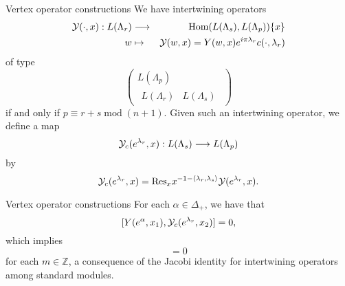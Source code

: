 \documentclass{beamer}
\begin{document}

\begin{frame}{Vertex operator constructions}
 We have intertwining operators
\begin{eqnarray*} \label{IntwOp}{ \cal Y}( \cdot , x): L(\Lambda_r) &
 \longrightarrow & \mbox{Hom}(L(\Lambda_s), L( \Lambda_p))\{ x \} \\ w
 & \mapsto & {\cal Y}(w, x)=Y(w, x)e^{i\pi\lambda_r}c(\cdot,
 \lambda_r) \nonumber \end{eqnarray*}
of type 
\begin{equation*} 
\label{type} \left( \begin{array} {c} L(
 \Lambda_p) \\ \begin{array}{cc} L( \Lambda_r) & L( \Lambda_s)
 \end{array} \end{array} \right)  
\end{equation*}
if and only if $p \equiv r+s \;
\mbox{mod}\; (n+1)$.
Given such an intertwining operator, we define a map
$${\cal Y}_c(e^{\lambda_r}, x): L(\Lambda_s) \longrightarrow
L(\Lambda_p)$$ by
$${\cal Y}_c(e^{\lambda_r}, x) = \mathrm{Res}_x x^{-1-\langle
  \lambda_r , \lambda_s\rangle}{\cal Y}(e^{\lambda_r}, x).$$
\end{frame}

\begin{frame}{Vertex operator constructions}
 For each
$\alpha \in \Delta_+$, we have that
\begin{equation} \label{calYcommute}
[Y(e^{\alpha}, x_1), {\cal Y}_c(e^{\lambda_r}, x_2)]=0,
\end{equation}
which implies
\begin{equation} 
[x_\alpha(m), {\cal Y}_c(e^{\lambda_r}, x_2)]=0
\end{equation}
for each $m \in \mathbb{Z}$, a consequence of the Jacobi identity for
intertwining operators among standard modules.
\end{frame}
\end{document}
